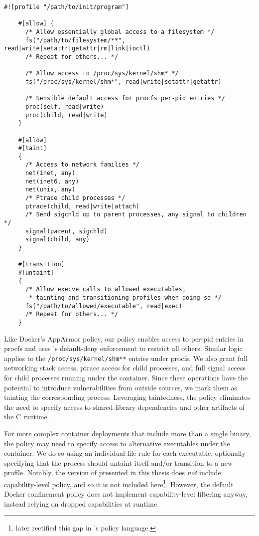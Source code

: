 \begin{lstlisting}[language=bpfbox, gobble=4,
  caption={[Implementing the default Docker policy in \bpfbox{}]
    Implementing the default Docker policy in \bpfbox{}.
    \todo{High-level overview of the policy}
  },
  label={lst:bpfbox-docker-default}]
    #![profile "/path/to/init/program"]

    #[allow] {
      /* Allow essentially global access to a filesystem */
      fs("/path/to/filesystem/**", read|write|setattr|getattr|rm|link|ioctl)
      /* Repeat for others... */

      /* Allow access to /proc/sys/kernel/shm* */
      fs("/proc/sys/kernel/shm*", read|write|setattr|getattr)

      /* Sensible default access for procfs per-pid entries */
      proc(self, read|write)
      proc(child, read|write)
    }

    #[allow]
    #[taint]
    {
      /* Access to network families */
      net(inet, any)
      net(inet6, any)
      net(unix, any)
      /* Ptrace child processes */
      ptrace(child, read|write|attach)
      /* Send sigchld up to parent processes, any signal to children */
      signal(parent, sigchld)
      signal(child, any)
    }

    #[transition]
    #[untaint]
    {
      /* Allow execve calls to allowed executables,
       * tainting and transitioning profiles when doing so */
      fs("/path/to/allowed/executable", read|exec)
      /* Repeat for others... */
    }
\end{lstlisting}

Like Docker's AppArmor policy, our \bpfbox{} policy enables access to per-pid entries in
procfs and uses \bpfbox{}'s default-deny enforcement to restrict all others. Similar logic
applies to the \texttt{/proc/sys/kernel/shm**} entries under procfs. We also grant full
networking stack access, ptrace access for child processes, and full signal access for
child processes running under the container. Since these operations have the potential to
introduce vulnerabilities from outside sources, we mark them as tainting the corresponding
process. Leveraging taintedness, the \bpfbox{} policy eliminates the need to specify
access to shared library dependencies and other artifacts of the C runtime.

For more complex container deployments that include more than a single binary, the
\bpfbox{} policy may need to specify access to alternative executables under the
container.  We do so using an individual file rule for each executable, optionally
specifying that the process should untaint itself and/or transition to a new profile.
Notably, the version of \bpfbox{} presented in this thesis does \textit{not} include
capability-level policy, and so it is not included here\footnote{\bpfcontain{} later
rectified this gap in \bpfbox{}'s policy language.}. However, the default Docker
confinement policy does not implement capability-level filtering anyway, instead relying
on dropped capabilities at runtime.

